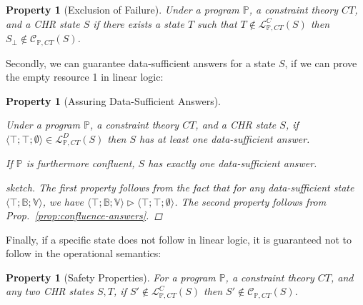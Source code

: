 \documentclass[acmtocl]{acmtrans2m}
\newtheorem{property}[theorem]{Property}
\newcommand\state[1]{\langle #1 \rangle}
\newcommand\ent{\rhd}
\newcommand{\bbP}{\ensuremath{\mathbb{P}}}
\newcommand{\B}{\ensuremath{\mathbb{B}}}
\newcommand{\V}{\ensuremath{\mathbb{V}}}
\newcommand{\cC}{\ensuremath{\mathcal{C}}}
\newcommand{\cL}{\mathcal{L}}
\begin{document}
\begin{property}[Exclusion of Failure]
\label{lemma:app-exclude-fail}
Under a program $\bbP$, a constraint theory $CT$, and a CHR state $S$ if there
exists a state $T$ such that $T\not\in\cL_{\bbP,CT}^C(S)$ then
$S_\bot\not\in\cC_{\bbP,CT}(S)$.
\end{property}

Secondly, we can guarantee data-sufficient answers for a state $S$, if we can
prove the empty resource 1 in linear logic:

\begin{property}[Assuring Data-Sufficient Answers]
\label{lemma:app-assure-ds}
\begin{longenum}
\item Under a program $\bbP$, a constraint theory $CT$, and a CHR state $S$, if
$\state{\top;\top;\emptyset}\in\cL_{\bbP,CT}^D(S)$ then $S$ has at least one
data-sufficient answer.
\item If $\bbP$ is furthermore confluent, $S$ has exactly one
data-sufficient answer.
\end{longenum}
\begin{proof}[sketch]
The first property follows from the fact that for any data-sufficient state
$\state{\top;\B;\V}$, we have
$\state{\top;\B;\V}\ent\state{\top;\top;\emptyset}$. The second property
follows from Prop.~\ref{prop:confluence-answers}.
\end{proof}
\end{property}

Finally, if a specific state does not follow in linear logic, it is guaranteed
not to follow in the operational semantics:

\begin{property}[Safety Properties]
\label{lemma:app-safety-properties}
For a program $\bbP$, a constraint theory $CT$, and any two CHR states $S,T$, if
$S'\not\in\cL_{\bbP,CT}^C(S)$ then $S'\not\in\cC_{\bbP,CT}(S)$.
\end{property}
\end{document}
